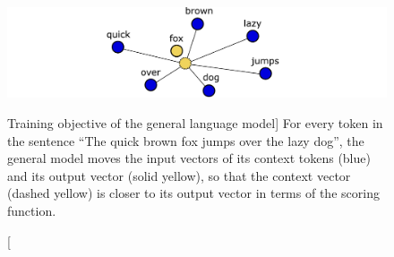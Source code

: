 \begin{figure}
\includegraphics{general-model}
\caption
  [Training objective of the general language model]%
  {For every token in the sentence ``The quick brown fox jumps over
   the lazy dog'', the general model moves the input vectors of
   its context tokens (blue) and its output vector (solid yellow),
   so that the context vector (dashed yellow) is closer to
   its output vector in terms of the scoring function.}
\label{fig:general-model}
\end{figure}
